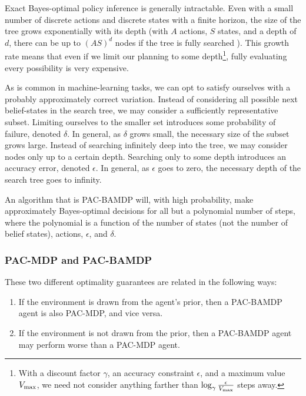 Exact Bayes-optimal policy inference is generally intractable. Even with a small number of discrete actions and discrete states with a finite horizon, the size of the tree grows exponentially with its depth (with $A$ actions, $S$ states, and a depth of $d$, there can be up to $(A S)^d$ nodes if the tree is fully searched ). This growth rate means that even if we limit our planning to some depth\footnote{With a discount factor $\gamma$, an accuracy constraint $\epsilon$, and a maximum value $V_{\rm max}$, we need not consider anything farther than $\log_\gamma \frac \epsilon {V_{\rm max}}$ steps away. }, fully evaluating every possibility is very expensive.

As is common in machine-learning tasks, we can opt to satisfy ourselves with a probably approximately correct variation. Instead of considering all possible next belief-states in the search tree, we may consider a sufficiently representative subset. Limiting ourselves to the smaller set introduces some probability of failure, denoted $\delta$. In general, as $\delta$ grows small, the necessary size of the subset grows large. Instead of searching infinitely deep into the tree, we may consider nodes only up to a certain depth. Searching only to some depth introduces an accuracy error, denoted $\epsilon$. In general, as $\epsilon$ goes to zero, the necessary depth of the search tree goes to infinity.

An algorithm that is PAC-BAMDP will, with high probability, make approximately Bayes-optimal decisions  for all but a polynomial number of steps, where the polynomial is a function of the number of states (not the number of belief states), actions, $\epsilon$, and $\delta$.

\subsubsection{PAC-MDP and PAC-BAMDP} These two different optimality guarantees are related in the following ways:

\begin{enumerate}
\item If the environment is drawn from the agent's prior, then a PAC-BAMDP agent is also PAC-MDP, and vice versa. \label{intro:opt:pac-equiv} 
\item If the environment is not drawn from the prior, then a PAC-BAMDP agent may perform worse than a PAC-MDP agent. 
\end{enumerate}

